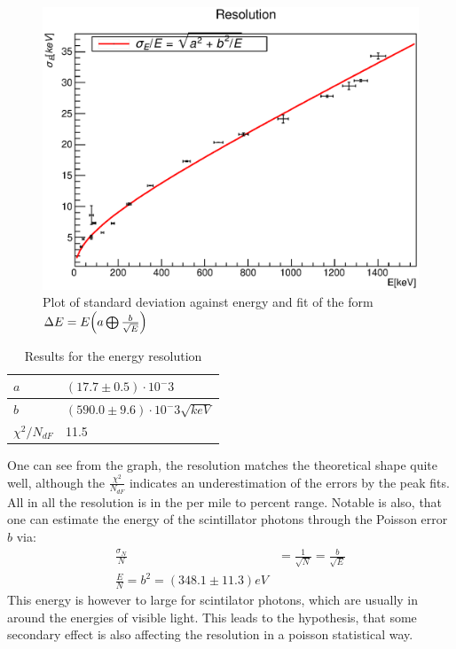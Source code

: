 \documentclass{article}
\begin{document}
\begin{figure}[H]
    \centering
    \includegraphics[width=\textwidth]{Graphen/resolution/resolution.eps}
    \caption{Plot of standard deviation against energy and fit of the form $\Delta E = E\qty(a \bigoplus \frac{b}{\sqrt{E}} )$}
    \label{res}
\end{figure}
\begin{table}[H]
    \centering
    \caption{Results for the energy resolution}
    \begin{tabular}{l|l}
        $a$ & $(17.7 \pm 0.5)\cdot10^-3$ \\\hline
        $b$ & $(590.0 \pm 9.6)\cdot10^-3\sqrt{keV}$ \\\hline
        $\chi^2/N_{dF}$ & 11.5\\
    \end{tabular}
\end{table}
One can see from the graph, the resolution matches the theoretical shape quite well, although the $\frac{\chi^2}{N_{dF}}$ indicates an underestimation of the errors by the peak fits.
All in all the resolution is in the per mile to percent range.
Notable is also, that one can estimate the energy of the scintillator photons through the Poisson error $b$ via:
\begin{align*}
    \frac{\sigma_N}{N} &= \frac{1}{\sqrt{N}} = \frac{b}{\sqrt{E}}\\
    \frac{E}{N} = b^2 = (348.1 \pm 11.3)eV
\end{align*}
This energy is however to large for scintilator photons, which are usually in around the energies of visible light.
This leads to the hypothesis, that some secondary effect is also affecting the resolution in a poisson statistical way.
\end{document}
